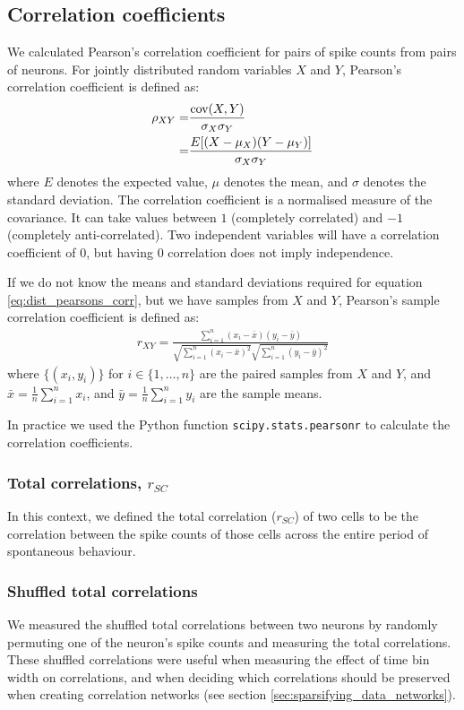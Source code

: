     \subsection{Correlation coefficients}
    We calculated Pearson's correlation coefficient for pairs of spike counts from pairs of neurons. For jointly distributed random variables $X$ and $Y$, Pearson's correlation coefficient is defined as:
    \begin{align}\label{eq:dist_pearsons_corr}
        \rho_{XY} =& \frac{\text{cov}(X,Y)}{\sigma_X \sigma_Y} \\
                  =& \frac{E[(X - \mu_X)(Y - \mu_Y)]}{\sigma_X \sigma_Y}
    \end{align}
    where $E$ denotes the expected value, $\mu$ denotes the mean, and $\sigma$ denotes the standard deviation. The correlation coefficient is a normalised measure of the covariance. It can take values between $1$ (completely correlated) and $-1$ (completely anti-correlated). Two independent variables will have a correlation coefficient of $0$, but having $0$ correlation does not imply independence.

    If we do not know the means and standard deviations required for equation \ref{eq:dist_pearsons_corr}, but we have samples from $X$ and $Y$, Pearson's sample correlation coefficient is defined as:
    \begin{align}
        r_{XY} = \frac{\sum_{i=1}^n (x_i - \bar{x})(y_i - \bar{y})}{\sqrt{\sum_{i=1}^n (x_i - \bar{x})^2}\sqrt{\sum_{i=1}^n (y_i - \bar{y})^2}}
    \end{align}
    where $\lbrace (x_i, y_i) \rbrace$ for $i \in \lbrace 1, \dots, n \rbrace$ are the paired samples from $X$ and $Y$, and $\bar{x} = \frac{1}{n}\sum_{i=1}^n x_i$, and $\bar{y} = \frac{1}{n}\sum_{i=1}^n y_i$ are the sample means.

    In practice we used the Python function \texttt{scipy.stats.pearsonr} to calculate the correlation coefficients.

        \subsubsection{Total correlations, $r_{SC}$}\label{sec:spike_count_correlation}
        In this context, we defined the total correlation ($r_{SC}$) of two cells to be the correlation between the spike counts of those cells across the entire period of spontaneous behaviour.

        \subsubsection{Shuffled total correlations}\label{sec:shuffled_correlations}
        We measured the shuffled total correlations between two neurons by randomly permuting one of the neuron's spike counts and measuring the total correlations. These shuffled correlations were useful when measuring the effect of time bin width on correlations, and when deciding which correlations should be preserved when creating correlation networks (see section \ref{sec:sparsifying_data_networks}).

